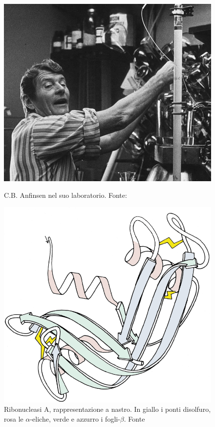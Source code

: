 \begin{figure}[!htb]
	\centering
	\includegraphics[scale=0.25]{images/anfinsen.jpg}
	\caption{C.B. Anfinsen nel suo laboratorio. Fonte: \cite{anfinsenNIH}}
	\label{fig:anfinsen}
	\endminipage\hfill
	\centering
	\includegraphics[scale=0.2]{images/RibonucleaseA_SS_paleRib.png}
	\caption{Ribonucleasi A, rappresentazione a nastro. In giallo i ponti disolfuro, rosa le $\alpha$-eliche, verde e azzurro i fogli-$\beta$. Fonte \cite{ribonucleasi-file}}
	\label{fig:ribonucleasi}
	\endminipage\hfill
\end{figure}

